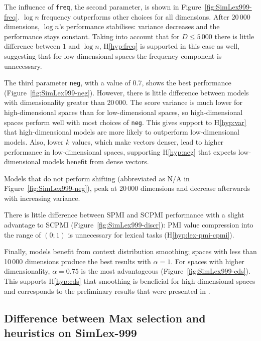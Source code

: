 The influence of \texttt{freq}, the second parameter, is shown in Figure~\ref{fig:SimLex999-freq}. $\log n$ frequency outperforms other choices for all dimensions. After 20\,000 dimensions, $\log n$'s performance stabilises: variance decreases and the performance stays constant. Taking into account that for $D \leq 5\,000$ there is little difference between $1$ and $\log n$, H\ref{hyp:freq} is supported in this case as well, suggesting that for low-dimensional spaces the frequency component is unnecessary.

The third parameter \texttt{neg}, with a value of 0.7, shows the best performance (Figure~\ref{fig:SimLex999-neg}). However, there is little difference between models with dimensionality greater than 20\,000. The score variance is much lower for high-dimensional spaces than for low-dimensional spaces, so high-dimensional spaces perform well with most choices of \texttt{neg}. This gives support to H\ref{hyp:var} that high-dimensional models are more likely to outperform low-dimensional models.
Also, lower $k$ values, which make vectors denser, lead to higher performance in low-dimensional spaces, supporting H\ref{hyp:neg} that expects low-dimensional models benefit from dense vectors.



Models that do not perform shifting (abbreviated as N/A in Figure~\ref{fig:SimLex999-neg}), peak at 20\,000 dimensions and decrease afterwards with increasing variance.

There is little difference between SPMI and SCPMI performance with a slight advantage to SCPMI (Figure~\ref{fig:SimLex999-discr}): PMI value compression into the range of $(0; 1)$ is unnecessary for lexical tasks (H\ref{hyp:lex-pmi-cpmi}).

Finally, models benefit from context distribution smoothing; spaces with less than 10\,000 dimensions produce the best results with $\alpha = 1$. For spaces with higher dimensionality, $\alpha = 0.75$ is the most advantageous (Figure~\ref{fig:SimLex999-cds}). This supports H\ref{hyp:cds} that smoothing is beneficial for high-dimensional spaces and corresponds to the preliminary results that were presented in .

\subsection{Difference between Max selection and heuristics on SimLex-999}

